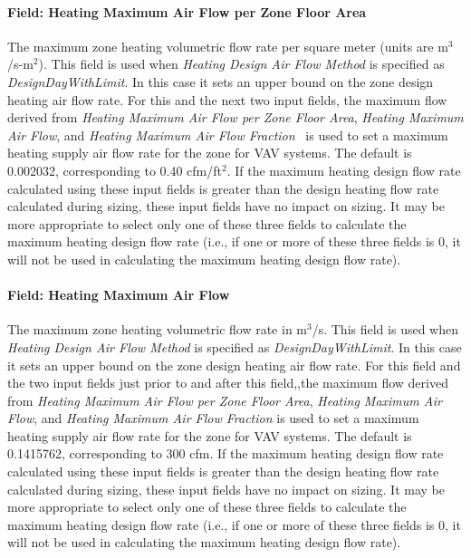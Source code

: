 \paragraph{Field: Heating Maximum Air Flow per Zone Floor Area}\label{field-heating-maximum-air-flow-per-zone-floor-area}

The maximum zone heating volumetric flow rate per square meter (units are m\(^{3}\)/s-m\(^{2}\)). This field is used when \emph{Heating Design Air Flow Method} is specified as \emph{DesignDayWithLimit}. In this case it sets an upper bound on the zone design heating air flow rate. For this and the next two input fields, the maximum flow derived from \emph{Heating Maximum Air Flow per Zone Floor Area}, \emph{Heating Maximum Air Flow}, and \emph{Heating Maximum Air Flow Fraction}~ is used to set a maximum heating supply air flow rate for the zone for VAV systems. The default is 0.002032, corresponding to 0.40 cfm/ft\(^{2}\). If the maximum heating design flow rate calculated using these input fields is greater than the design heating flow rate calculated during sizing, these input fields have no impact on sizing. It may be more appropriate to select only one of these three fields to calculate the maximum heating design flow rate (i.e., if one or more of these three fields is 0, it will not be used in calculating the maximum heating design flow rate).

\paragraph{Field: Heating Maximum Air Flow}\label{field-heating-maximum-air-flow}

The maximum zone heating volumetric flow rate in m\(^{3}\)/s. This field is used when \emph{Heating Design Air Flow Method} is specified as \emph{DesignDayWithLimit}. In this case it sets an upper bound on the zone design heating air flow rate. For this field and the two input fields just prior to and after this field,,the maximum flow derived from \emph{Heating Maximum Air Flow per Zone Floor Area}, \emph{Heating Maximum Air Flow}, and \emph{Heating Maximum Air Flow Fraction} is used to set a maximum heating supply air flow rate for the zone for VAV systems. The default is 0.1415762, corresponding to 300 cfm. If the maximum heating design flow rate calculated using these input fields is greater than the design heating flow rate calculated during sizing, these input fields have no impact on sizing. It may be more appropriate to select only one of these three fields to calculate the maximum heating design flow rate (i.e., if one or more of these three fields is 0, it will not be used in calculating the maximum heating design flow rate).

